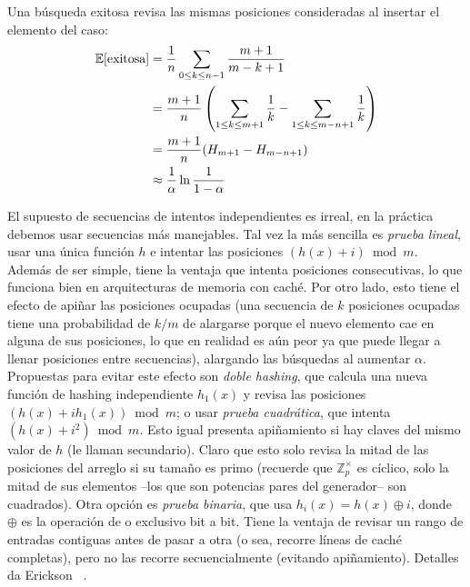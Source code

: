   Una búsqueda exitosa revisa las mismas posiciones
  consideradas al insertar el elemento del caso:
  \begin{align*}
    \operatorname{\mathbb{E}}[\text{exitosa}]
      &= \frac{1}{n}
           \sum_{0 \le k \le n - 1} \frac{m + 1}{m - k + 1} \notag \\
      &= \frac{m + 1}{n}
            \left(
              \sum_{1 \le k \le m + 1} \frac{1}{k}
                - \sum_{1 \le k \le m - n + 1} \frac{1}{k}
            \right) \notag \\
      &= \frac{m + 1}{n} (H_{m + 1} - H_{m - n + 1}) \notag \\
      &\approx \frac{1}{\alpha} \ln \frac{1}{1 - \alpha}
            \label{eq:open-hashing:success}
  \end{align*}

  El supuesto de secuencias de intentos independientes es irreal,
  en la práctica debemos usar secuencias más manejables.
  Tal vez la más sencilla es \emph{prueba lineal},
  usar una única función \(h\)
  e intentar las posiciones \((h(x) + i) \bmod m\).
  Además de ser simple,
  tiene la ventaja que intenta posiciones consecutivas,
  lo que funciona bien en arquitecturas de memoria con caché.
  Por otro lado,
  esto tiene el efecto de apiñar las posiciones ocupadas
  (una secuencia de \(k\) posiciones ocupadas tiene una probabilidad
   de \(k / m\) de alargarse
   porque el nuevo elemento cae en alguna de sus posiciones,
   lo que en realidad es aún peor ya que puede llegar a llenar posiciones
   entre secuencias),
  alargando las búsquedas al aumentar \(\alpha\).
  Propuestas para evitar este efecto son \emph{doble hashing},
  que calcula una nueva función de hashing independiente \(h_1(x)\)
  y revisa las posiciones \((h(x) + i h_1(x)) \bmod m\);
  o usar \emph{prueba cuadrática},
  que intenta \((h(x) + i^2) \bmod m\).
  Esto igual presenta apiñamiento
  si hay claves del mismo valor de \(h\)
  (le llaman secundario).
  Claro que esto solo revisa la mitad de las posiciones del arreglo
  si su tamaño es primo
  (recuerde que \(\mathbb{Z}_p^\times\) es cíclico,
   solo la mitad de sus elementos
   --los que son potencias pares del generador--
   son cuadrados).
  Otra opción es \emph{prueba binaria},
  que usa \(h_i(x) = h(x) \oplus i\),
  donde \(\oplus\) es la operación de o exclusivo bit a bit.
  Tiene la ventaja de revisar un rango de entradas contiguas
  antes de pasar a otra
  (o sea,
   recorre líneas de caché completas),
  pero no las recorre secuencialmente
  (evitando apiñamiento).
  Detalles da Erickson~%
    \cite{erickson19:_algorithms}.

